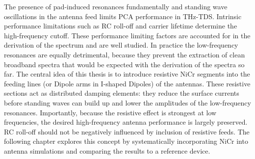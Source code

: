 The presence of pad-induced resonances fundamentally and standing wave oscillations in the antenna feed limits PCA performance in THz-TDS. Intrinsic performance limitations such as RC roll-off and carrier lifetime determine the high-frequency cutoff. These performance limiting factors are accounted for in the derivation of the spectrum and are well studied. In practice the low-frequency resonances are equally detrimental, because they prevent the extraction of clean broadband spectra that would be expected with the derivation of the spectra so far. The central idea of this thesis is to introduce resistive NiCr segments into the feeding lines (or Dipole arms in I-shaped Dipoles) of the antennas. These resistive sections act as distributed damping elements: they reduce the surface currents before standing waves can build up and lower the amplitudes of the low-frequency resonances. Importantly, because the resistive effect is strongest at low frequencies, the desired high-frequency antenna
performance is largely preserved. RC roll-off should not be negatively influenced by inclusion of resistive feeds. The following chapter explores this concept by systematically incorporating NiCr into antenna simulations and comparing the results to a reference device.



